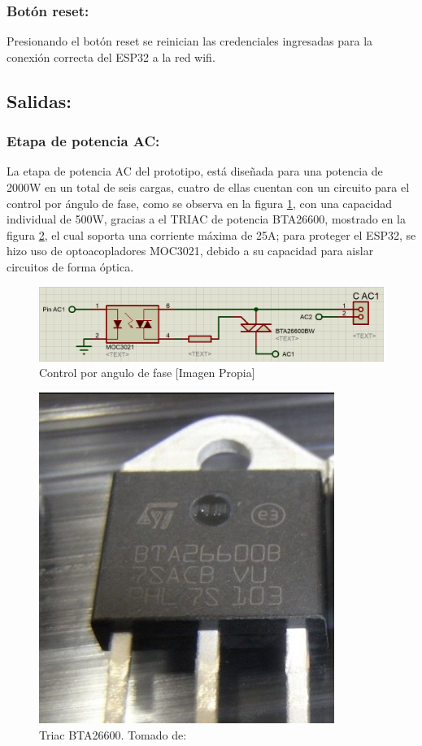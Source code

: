 	\subsubsection{Botón reset:}
		Presionando el botón reset se reinician las credenciales ingresadas para la conexión correcta del ESP32 a la red wifi.\\
		
	\subsection{Salidas:}
	\subsubsection{Etapa de potencia AC:}
		La etapa de potencia AC del prototipo, está diseñada para una potencia de 2000W en un total de seis cargas, cuatro de ellas cuentan con un circuito para el control por ángulo de fase, como se observa en la figura \ref{fig:CAC1}, con una capacidad individual de 500W, gracias a el TRIAC de potencia BTA26600, mostrado en la figura \ref{fig:TRIAC}, el cual soporta una corriente máxima de 25A; para proteger el ESP32, se hizo uso de optoacopladores MOC3021, debido a su capacidad para aislar circuitos de forma óptica.\\
		
		\begin{figure}[H]
			\centering
			\caption{Control por angulo de fase [Imagen Propia]}
			\label{fig:CAC1}
			\includegraphics[width=0.8\linewidth]{Imagenes/CAC1}
		\end{figure}
	
		\begin{figure}[H]
			\centering
			\caption{Triac BTA26600. Tomado de: \cite{TRIAC}}
			\label{fig:TRIAC}
			\includegraphics[width=0.35\linewidth]{Imagenes/TRIAC}
		\end{figure}
	
